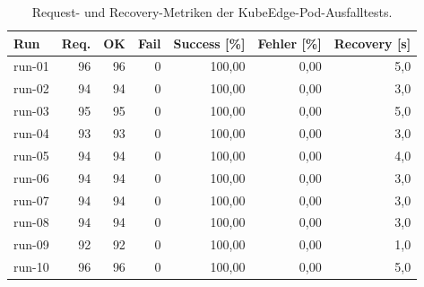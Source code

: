 \begin{table}[H]
\centering
\begin{tabular}{lrrrrrr}
\toprule
\textbf{Run} & \textbf{Req.} & \textbf{OK} & \textbf{Fail} & \textbf{Success [\%]} & \textbf{Fehler [\%]} & \textbf{Recovery [s]} \\
\midrule
run-01 & 96 & 96 & 0 & 100,00 & 0,00 & 5,0 \\
run-02 & 94 & 94 & 0 & 100,00 & 0,00 & 3,0 \\
run-03 & 95 & 95 & 0 & 100,00 & 0,00 & 5,0 \\
run-04 & 93 & 93 & 0 & 100,00 & 0,00 & 3,0 \\
run-05 & 94 & 94 & 0 & 100,00 & 0,00 & 4,0 \\
run-06 & 94 & 94 & 0 & 100,00 & 0,00 & 3,0 \\
run-07 & 94 & 94 & 0 & 100,00 & 0,00 & 3,0 \\
run-08 & 94 & 94 & 0 & 100,00 & 0,00 & 3,0 \\
run-09 & 92 & 92 & 0 & 100,00 & 0,00 & 1,0 \\
run-10 & 96 & 96 & 0 & 100,00 & 0,00 & 5,0 \\
\bottomrule
\end{tabular}
\caption{Request- und Recovery-Metriken der KubeEdge-Pod-Ausfalltests.}
\label{tab:appendix-kubeedge-pod-failure-requests}
\end{table}
